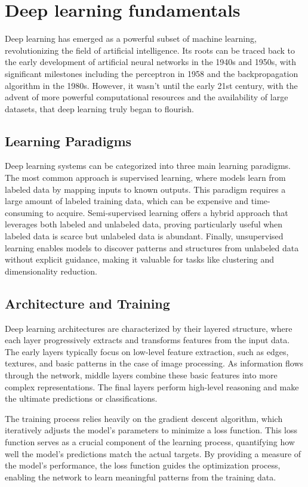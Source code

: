\section{Deep learning fundamentals}

Deep learning has emerged as a powerful subset of machine learning,
revolutionizing the field of artificial intelligence. Its roots can
be traced back to the early development of artificial neural networks
in the 1940s and 1950s, with significant milestones including the
perceptron in 1958 and the backpropagation algorithm in the 1980s.
However, it wasn't until the early 21st century, with the advent of
more powerful computational resources and the availability of large
datasets, that deep learning truly began to flourish.

\subsection{Learning Paradigms}

Deep learning systems can be categorized into three main learning paradigms.
The most common approach is supervised learning, where models learn from
labeled data by mapping inputs to known outputs. This paradigm requires a
large amount of labeled training data, which can be expensive and
time-consuming to acquire. Semi-supervised learning offers a hybrid
approach that leverages both labeled and unlabeled data, proving
particularly useful when labeled data is scarce but unlabeled data is
abundant. Finally, unsupervised learning enables models to discover
patterns and structures from unlabeled data without explicit guidance,
making it valuable for tasks like clustering and dimensionality
reduction.

\subsection{Architecture and Training}

Deep learning architectures are characterized by their layered
structure, where each layer progressively extracts and transforms
features from the input data. The early layers typically focus on
low-level feature extraction, such as edges, textures, and basic
patterns in the case of image processing. As information flows through
the network, middle layers combine these basic features into more
complex representations. The final layers perform high-level reasoning
and make the ultimate predictions or classifications.

The training process relies heavily on the gradient descent
algorithm, which iteratively adjusts the model's parameters to
minimize a loss function. This loss function serves as a crucial
component of the learning process, quantifying how well the model's
predictions match the actual targets. By providing a measure of the
model's performance, the loss function guides the optimization process,
enabling the network to learn meaningful patterns from the training
data.

